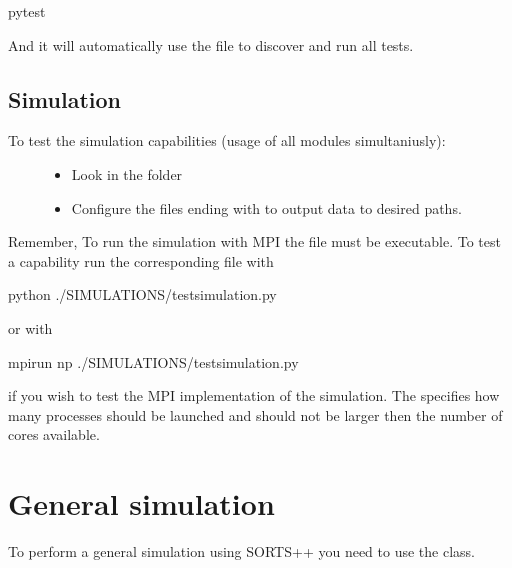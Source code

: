 \documentclass[letterpaper,10pt,english]{sphinxmanual}
\begin{document}
%
\begin{sphinxVerbatim}[commandchars=\\\{\}]
pytest
\end{sphinxVerbatim}

And it will automatically use the  file to discover and run all tests.


\subsection{Simulation}
\label{\detokenize{introduction/introduction:simulation}}\begin{description}
\item[{To test the simulation capabilities (usage of all modules simultaniusly):}] \leavevmode\begin{itemize}
\item {} 
Look in the  folder

\item {} 
Configure the files ending with  to output data to desired paths.

\end{itemize}

\end{description}

Remember, To run the simulation with MPI the file must be executable. To test a capability run the corresponding  file with

%
\begin{sphinxVerbatim}[commandchars=\\\{\}]
python ./SIMULATIONS/test\PYGZus{}simulation.py
\end{sphinxVerbatim}

or with

%
\begin{sphinxVerbatim}[commandchars=\\\{\}]
mpirun \PYGZhy{}np  ./SIMULATIONS/test\PYGZus{}simulation.py
\end{sphinxVerbatim}

if you wish to test the MPI implementation of the simulation. The  specifies how many processes should be launched and should not be larger then the number of cores available.


\section{General simulation}
\label{\detokenize{introduction/introduction:general-simulation}}
To perform a general simulation using SORTS++ you need to use the  class.
\end{document}

